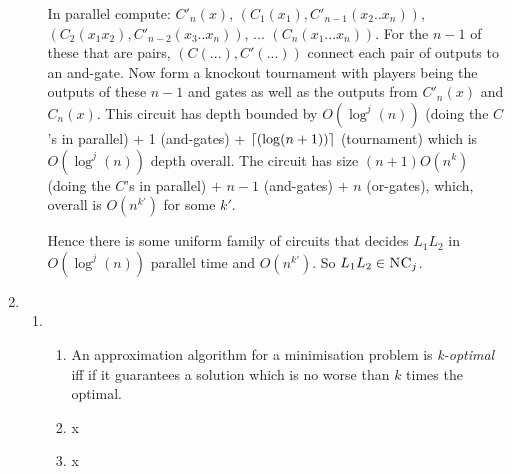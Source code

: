 \documentclass[a4paper, draft, 12pt]{article}
\begin{document}
\begin{enumerate}
\begin{enumerate}
In parallel compute: $C'_n(x)$, $(C_1(x_1),C'_{n-1}(x_2..x_n))$, 
$(C_2(x_1x_2),C'_{n-2}(x_3..x_n))$, ... $(C_n(x_1...x_n))$. For the $n-1$ 
of these that are pairs, $(C(...),C'(...))$ connect each pair of outputs to an and-gate.
Now form a knockout tournament with players being the outputs of these $n-1$ and gates as 
well as the outputs from $C'_n(x)$ and $C_n(x)$. This circuit has depth bounded by
$O(\log^j(n))$ (doing the $C$'s in parallel) $+$ 1 (and-gates) + $\lceil(\log(n+1))\rceil$ (tournament)
which is $O(\log^j(n))$ depth overall. The circuit has size $(n+1)O(n^k)$ (doing the $C$'s in parallel) 
$+$ $n-1$ (and-gates) $+$ $n$ (or-gates), which, overall is $O(n^{k'})$ for some $k'$. 

Hence there is some uniform family of circuits that decides $L_1L_2$
in $O(\log^j(n))$ parallel time and $O(n^{k'})$. So $L_1L_2 \in \textsc{NC}_j$.
\end{enumerate}
\item %
\begin{enumerate}
\item %
  \begin{enumerate}
  \item %
  An approximation algorithm for a minimisation problem is \textit{k-optimal} iff
  if it guarantees a solution which is no worse than $k$ times the optimal.
  \item %
  x
  \item %
  x
  \end{enumerate}
\end{enumerate}


\end{enumerate}
\end{document}

